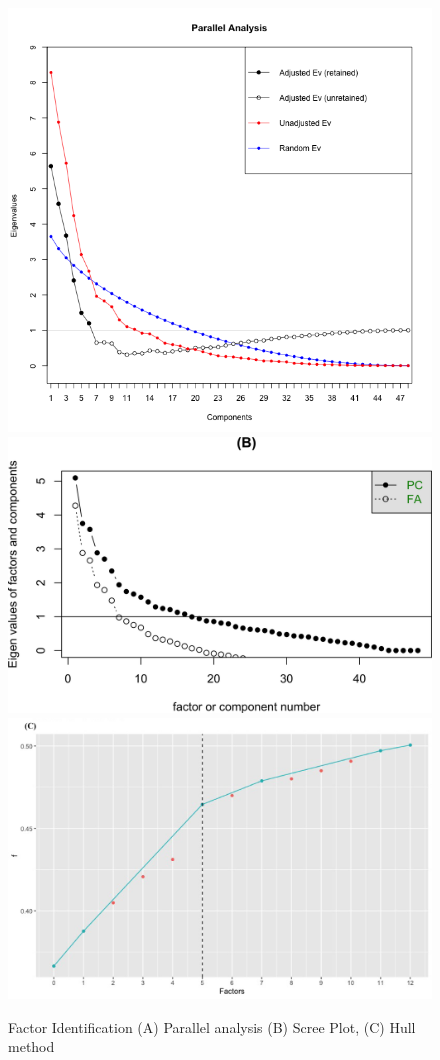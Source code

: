 \documentclass[
  english,
  man]{apa6}
\begin{document}
\begin{figure}

{\centering \includegraphics[width=0.5\linewidth,height=0.5\textheight]{parallel} \includegraphics[width=0.5\linewidth,height=0.5\textheight]{manuscript_files/figure-latex/facid-2} \includegraphics[width=0.5\linewidth,height=0.5\textheight]{HUll method} 

}

\caption{Factor Identification (A) Parallel analysis (B) Scree Plot, (C) Hull method}\label{fig:facid}
\end{figure}
\end{document}
